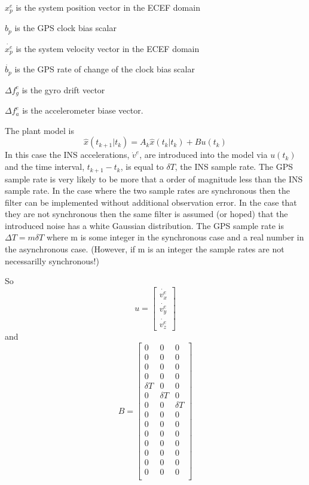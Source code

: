 \documentclass[a4paper]{report}
\numberwithin{equation}{chapter}
\begin{document}
$x^e_p$ is the system position vector in the ECEF domain

$b_p$ is the GPS clock bias scalar

$\dot{x^e_p}$ is the system velocity vector in the ECEF domain

$\dot{b_p}$ is the GPS rate of change of the clock bias scalar

$\Delta f^e_g$ is the gyro drift vector

$\Delta f^e_a$ is the accelerometer biase vector.

\bigskip

The plant model is
\begin{equation}
\hat{x} \left( t_{k + 1} | t_k \right) = A_k \hat{x} \left( t_k | t_k \right) + B u \left( t_k \right)
\label{eqn:PlantModel}
\end{equation}
In this case the INS accelerations, $\dot{v}^e$, are introduced into the model via $u \left( t_k \right)$ and the time interval, $t_{k + 1} - t_k$, is equal to $\delta T$, the INS sample rate. The GPS sample rate is very likely to be more that a order of magnitude less than the INS sample rate. In the case where the two sample rates are synchronous then the filter can be implemented without additional observation error. In the case that they are not synchronous then the same filter is assumed (or hoped) that the introduced noise has a white Gaussian distribution. The GPS sample rate is $\Delta T = m \delta T$ where m is some integer in the synchronous case and a real number in the asynchronous case. (However, if m is an integer the sample rates are not necessarilly synchronous!)

\bigskip

So
\begin{equation}
u =
\begin{bmatrix}
\dot{v^e_x}\\
\dot{v^e_y}\\
\dot{v^e_z}
\end{bmatrix}
\end{equation}
and
\begin{equation}
B =
\begin{bmatrix}
0 & 0 & 0\\
0 & 0 & 0\\
0 & 0 & 0\\
0 & 0 & 0\\
\delta T & 0 & 0\\
0 & \delta T & 0\\
0 & 0 & \delta T\\
0 & 0 & 0\\
0 & 0 & 0\\
0 & 0 & 0\\
0 & 0 & 0\\
0 & 0 & 0\\
0 & 0 & 0\\
0 & 0 & 0\\
\end{bmatrix}
\end{equation}
\end{document}
